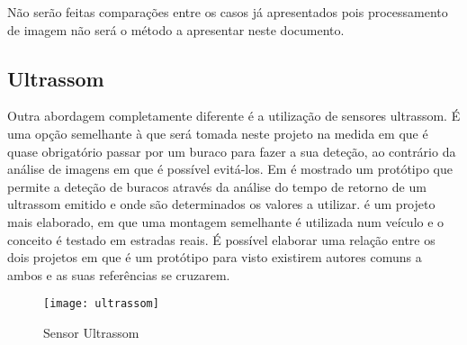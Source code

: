Não serão feitas comparações entre os casos já apresentados pois processamento de imagem não será o método a apresentar neste documento.

\subsection{Ultrassom}
\label{subsec: ultrassom}
Outra abordagem completamente diferente é a utilização de sensores ultrassom. É uma opção semelhante à que será tomada neste projeto na medida em que é quase obrigatório passar por um buraco para fazer a sua deteção, ao contrário da análise de imagens em que é possível evitá-los. Em \cite{Hegde2015} é mostrado um protótipo que permite a deteção de buracos através da análise do tempo de retorno de um ultrassom emitido e onde são determinados os valores a utilizar. \cite{Madli2015} é um projeto mais elaborado, em que uma montagem semelhante é utilizada num veículo e o conceito é testado em estradas reais. É possível elaborar uma relação entre os dois projetos em que \cite{Hegde2015} é um protótipo para \cite{Madli2015} visto existirem autores comuns a ambos e as suas referências se cruzarem.
\begin{figure}[hbtp]
	\centering
	\texttt{[image: ultrassom]}
	\caption{Sensor Ultrassom}
	\label{fig:sensor_ultrassom}
\end{figure}

